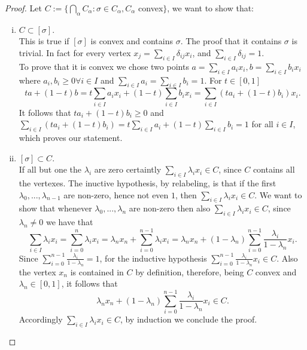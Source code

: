 \documentclass[../1.tex]{subfiles}
\begin{document}
    \begin{proof}
        Let $C := \{ \bigcap_\alpha C_\alpha : \sigma \in C_\alpha, C_\alpha$ convex$\}$, we want to show that:
        \begin{enumerate}[(i)]
            \item $C \subset [\sigma]$.\\
            This is true if $[\sigma]$ is convex and contains $\sigma$.
            The proof that it contains $\sigma$ is trivial. In fact for every vertex $x_j = \sum_{i \in I} \delta_{ij} x_i$,
            and $\sum_{i \in I}\delta_{ij} = 1$.\\
            To prove that it is convex we chose two points $a = \sum_{i \in I} a_i x_i, b = \sum_{i \in I} b_i x_i$ where $a_i,b_i \geq 0 \forall i \in I$
            and $\sum_{i \in I} a_i = \sum_{i \in I} b_i = 1$. For $t \in [0,1]$
            \[ ta+(1-t)b = t\sum_{i \in I} a_i x_i + (1-t) \sum_{i \in I} b_i x_i = \sum_{i \in I} (ta_i + (1-t)b_i)x_i.\]
            It follows that $ta_i + (1-t)b_i \geq 0$ and $\sum_{i \in I} (ta_i + (1-t)b_i) = t\sum_{i \in I}a_i + (1-t)\sum_{i \in I}b_i = 1$ for all $i \in I$,
            which proves our statement.

            \item $[\sigma] \subset C$.\\
            If all but one the $\lambda_i$ are zero certaintly $\sum_{i \in I} \lambda_i x_i \in C$, since $C$ contains all the vertexes.
            The inuctive hypothesis, by relabeling, is that if the first $\lambda_0,...,\lambda_{n-1}$ are non-zero, hence not even $1$, then $\sum_{i \in I} \lambda_i x_i \in C$.
            We want to show that whenever $\lambda_0,...,\lambda_n$ are non-zero then also $\sum_{i \in I} \lambda_i x_i \in C$, since $\lambda_n \neq 0$ we have that
            \[ \sum_{i \in I} \lambda_i x_i =  \sum_{i = 0}^n \lambda_i x_i = \lambda_n x_n + \sum_{i = 0}^{n-1} \lambda_i x_i =
               \lambda_n x_n + (1 - \lambda_n) \sum_{i = 0}^{n-1} \frac{\lambda_i}{1 - \lambda_n} x_i.\]
            Since $\sum_{i = 0}^{n-1} \frac{\lambda_i}{1 - \lambda_n} = 1$, for the inductive hypothesis $\sum_{i = 0}^{n-1} \frac{\lambda_i}{1 - \lambda_n} x_i \in C$.
            Also the vertex $x_n$ is contained in $C$ by definition, therefore, being $C$ convex and $\lambda_n \in [0,1]$, it follows that 
            \[ \lambda_n x_n + (1 - \lambda_n) \sum_{i = 0}^{n-1} \frac{\lambda_i}{1 - \lambda_n} x_i \in C. \]
            Accordingly $\sum_{i \in I} \lambda_i x_i \in C$, by induction we conclude the proof.


\end{enumerate}
\end{proof}
\end{document}

